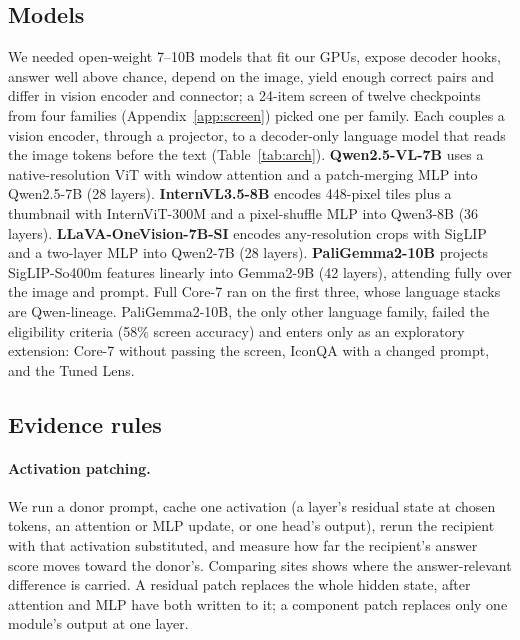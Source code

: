 \documentclass[11pt]{article}
\begin{document}
\subsection{Models}

We needed open-weight 7--10B models that fit our GPUs, expose decoder hooks, answer well above chance, depend on the image, yield enough correct pairs and differ in vision encoder and connector; a 24-item screen of twelve checkpoints from four families (Appendix~\ref{app:screen}) picked one per family. Each couples a vision encoder, through a projector, to a decoder-only language model that reads the image tokens before the text (Table~\ref{tab:arch}). \textbf{Qwen2.5-VL-7B} \citep{bai2025qwen25vl} uses a native-resolution ViT with window attention and a patch-merging MLP into Qwen2.5-7B (28 layers). \textbf{InternVL3.5-8B} \citep{wang2025internvl35} encodes 448-pixel tiles plus a thumbnail with InternViT-300M and a pixel-shuffle MLP into Qwen3-8B (36 layers). \textbf{LLaVA-OneVision-7B-SI} \citep{li2024llavaov} encodes any-resolution crops with SigLIP and a two-layer MLP into Qwen2-7B (28 layers). \textbf{PaliGemma2-10B} \citep{beyer2024paligemma,steiner2024paligemma2} projects SigLIP-So400m features linearly into Gemma2-9B (42 layers), attending fully over the image and prompt. Full Core-7 ran on the first three, whose language stacks are Qwen-lineage. PaliGemma2-10B, the only other language family, failed the eligibility criteria (58\% screen accuracy) and enters only as an exploratory extension: Core-7 without passing the screen, IconQA with a changed prompt, and the Tuned Lens.

\subsection{Evidence rules}

\paragraph{Activation patching.} We run a donor prompt, cache one activation (a layer's residual state at chosen tokens, an attention or MLP update, or one head's output), rerun the recipient with that activation substituted, and measure how far the recipient's answer score moves toward the donor's. Comparing sites shows where the answer-relevant difference is carried. A residual patch replaces the whole hidden state, after attention and MLP have both written to it; a component patch replaces only one module's output at one layer.
\end{document}
